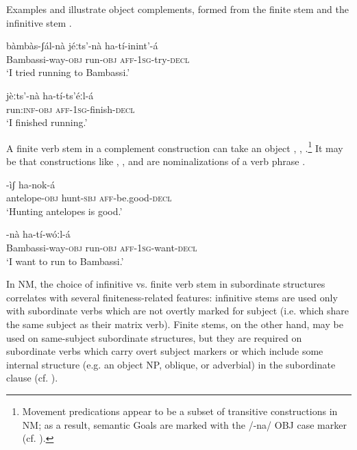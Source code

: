 \documentclass[output=paper]{langsci/langscibook}
\begin{document}
Examples  and  illustrate object complements, formed from the finite stem  and the infinitive stem . 

\ea\label{ex:mahland:36}
\gll bàmbàs-ʃál-nà            jéːts'-nà    ha-tí-inint'-{\downstep}á\\
Bambassi-way-\textsc{obj}    run\textsc{{}-obj}     \textsc{aff-1sg}{}-try\textsc{{}-decl} \\
\glt `I tried running to Bambassi.'
\z

\ea\label{ex:mahland:37}
\gll jèːts'-nà        ha-tí-ts'éːl-{\downstep}á\\
run:\textsc{inf-obj}   \textsc{aff-1sg}{}-finish-\textsc{decl} \\
\glt `I finished running.'
\z

A finite verb stem in a complement construction can take an object , , .\footnote{Movement predications appear to be a subset of transitive constructions in NM; as a result, semantic Goals are marked with the /-na/ OBJ case marker (cf. \citealt[335-339]{Ahland2012}).} It may be that constructions like , , and  are nominalizations of a verb phrase \citep[625]{Ahland2012}.

\ea\label{ex:mahland:38}
-ìʃ     ha-nok-á \\
antelope\textsc{{}-obj}    hunt\textsc{{}-sbj}       \textsc{aff}-be.good\textsc{{}-decl} \\
\glt `Hunting antelopes is good.'
\z

\ea\label{ex:mahland:39}
-nà    ha-tí-wóːl-{\downstep}á\\
{\db}Bambassi-way\textsc{{}-obj}     run\textsc{{}-obj}      \textsc{aff-1sg}{}-want\textsc{{}-decl} \\
\glt `I want to run to Bambassi.'
\z

In NM, the choice of infinitive vs. finite verb stem in subordinate structures correlates with several finiteness-related features: infinitive stems are used only with subordinate verbs which are not overtly marked for subject (i.e. which share the same subject as their matrix verb). Finite stems, on the other hand, may be used on same-subject subordinate structures, but they are required on subordinate verbs which carry overt subject markers or which include some internal structure (e.g. an object NP, oblique, or adverbial) in the subordinate clause (cf. \citealt[612, 630]{Ahland2012M}). 
\end{document}
